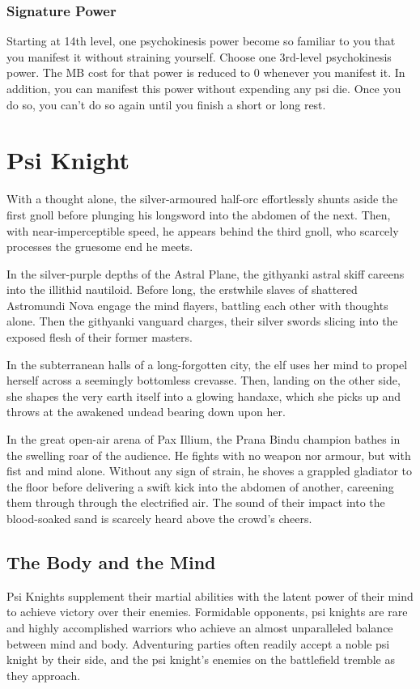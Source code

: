 \subsubsection{Signature Power}
Starting at 14th level,
one psychokinesis power become so familiar to you that you
manifest it without straining yourself.
Choose one 3rd-level psychokinesis power.
The MB cost for that power is reduced to 0 whenever you manifest it.
In addition, you can manifest this power without expending
any psi die.
Once you do so,
you can't do so again until you finish a short or long rest.

\clearpage\section{Psi Knight}
\label{sec:psi_knight}
\DndSetThemeColor[DmgCoral]
With a thought alone, the silver-armoured half-orc effortlessly
shunts aside the first gnoll before plunging his longsword
into the abdomen of the next.
Then, with near-imperceptible speed, he appears behind the third gnoll,
who scarcely processes the gruesome end he meets.

In the silver-purple depths of the Astral Plane,
the githyanki astral skiff careens into the illithid nautiloid.
Before long, the erstwhile slaves of shattered Astromundi Nova
engage the mind flayers,
battling each other with thoughts alone.
Then the githyanki vanguard charges,
their silver swords slicing into the exposed flesh of their former
masters.

In the subterranean halls of a long-forgotten city,
the elf uses her mind to propel herself across a seemingly
bottomless crevasse.
Then, landing on the other side,
she shapes the very earth itself into a glowing handaxe,
which she picks up and throws at the awakened undead
bearing down upon her.

In the great open-air arena of Pax Illium,
the Prana Bindu champion bathes in the swelling roar
of the audience.
He fights with no weapon nor armour,
but with fist and mind alone.
Without any sign of strain,
he shoves a grappled gladiator to the floor
before delivering a swift kick into the abdomen of another,
careening them through through the electrified air.
The sound of their impact into the blood-soaked sand
is scarcely heard above the crowd's cheers.

\subsection{The Body and the Mind}
Psi Knights supplement their martial abilities
with the latent power of their mind to
achieve victory over their enemies.
Formidable opponents,
psi knights are rare and highly accomplished warriors
who achieve an almost unparalleled balance between mind
and body.
Adventuring parties often readily accept a noble psi knight
by their side,
and the psi knight's enemies on the battlefield tremble
as they approach.

